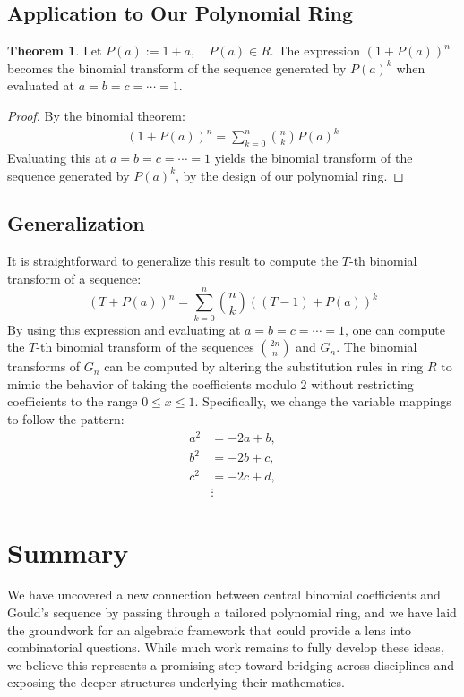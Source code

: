 \documentclass{article}
\theoremstyle{plain}
\theoremstyle{definition}
\newtheorem{thm}{Theorem}
\begin{document}
\subsection{Application to Our Polynomial Ring}
\begin{thm}
\label{thm:3}
Let \( P(a) := 1+a, \quad P(a) \in R\). The expression \( (1 + P(a))^n \) becomes the binomial transform of the sequence generated by \( P(a)^k \) when evaluated at \( a=b=c=\cdots=1 \).
\end{thm}

\begin{proof}
By the binomial theorem:
\begin{align*}
    (1 + P(a))^n = \sum_{k=0}^{n} \binom{n}{k} P(a)^k
\end{align*}
Evaluating this at \( a=b=c=\cdots=1 \) yields the binomial transform of the sequence generated by \( P(a)^k \), by the design of our polynomial ring.
\end{proof}

\subsection{Generalization}
It is straightforward to generalize this result to compute the \( T \)-th binomial transform of a sequence:
\[
    (T + P(a))^n = \sum_{k=0}^{n} \binom{n}{k} ((T-1) + P(a))^k
\]
By using this expression and evaluating at \( a=b=c=\cdots=1 \), one can compute the \( T \)-th binomial transform of the sequences \(\binom{2n}{n}\) and \(G_n\). The binomial transforms of \(G_n\) can be computed by altering the substitution rules in ring \(R\) to mimic the behavior of taking the coefficients modulo \( 2 \) without restricting coefficients to the range \(0 \leq x \leq 1\). Specifically, we change the variable mappings to follow the pattern:
\[
\begin{aligned}
    a^2 &= -2a + b, \\
    b^2 &= -2b + c, \\
    c^2 &= -2c + d, \\
    &\vdots
\end{aligned}
\]

\section{Summary}
We have uncovered a new connection between central binomial coefficients and Gould's sequence by passing through a tailored polynomial ring, and we have laid the groundwork for an algebraic framework that could provide a lens into combinatorial questions. While much work remains to fully develop these ideas, we believe this represents a promising step toward bridging across disciplines and exposing the deeper structures underlying their mathematics.
\end{document}
